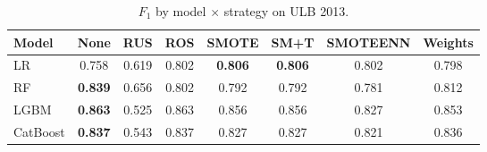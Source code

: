 \begin{table}[ht]
\centering
\caption{$F_1$ by model $\times$ strategy on ULB 2013.}
\label{tab:factorial_ulb_f1}
\begin{tabular}{l c c c c c c c}
\toprule
Model & None & RUS & ROS & SMOTE & SM+T & SMOTEENN & Weights \\
\midrule
LR         & 0.758 & 0.619 & 0.802 & \textbf{0.806} & \textbf{0.806} & 0.802 & 0.798 \\
RF         & \textbf{0.839} & 0.656 & 0.802 & 0.792 & 0.792 & 0.781 & 0.812 \\
LGBM       & \textbf{0.863} & 0.525 & 0.863 & 0.856 & 0.856 & 0.827 & 0.853 \\
CatBoost   & \textbf{0.837} & 0.543 & 0.837 & 0.827 & 0.827 & 0.821 & 0.836 \\
\bottomrule
\end{tabular}
\end{table}
